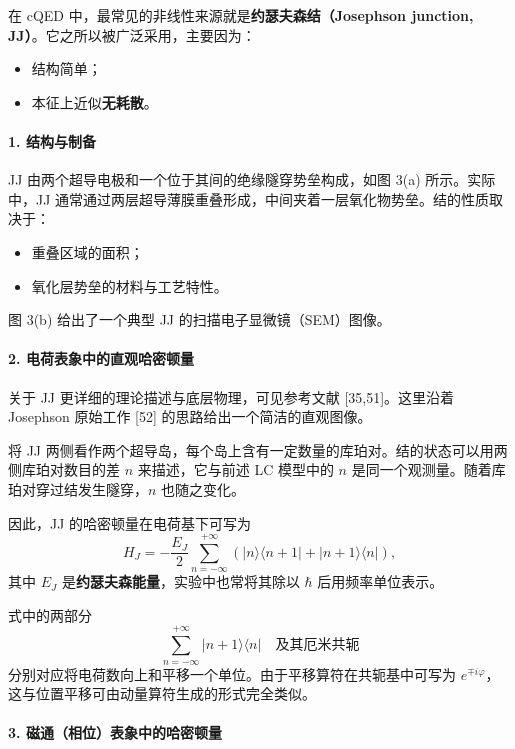 \documentclass[12pt,a4paper,oneside]{ctexbook}
\begin{document}
在 cQED 中，最常见的非线性来源就是\textbf{约瑟夫森结（Josephson junction, JJ）}。它之所以被广泛采用，主要因为：
\begin{itemize}[leftmargin=2em]
    \item 结构简单；
    \item 本征上近似\textbf{无耗散}。
\end{itemize}

\paragraph{1. 结构与制备}

JJ 由两个超导电极和一个位于其间的绝缘隧穿势垒构成，如图 3(a) 所示。实际中，JJ 通常通过两层超导薄膜重叠形成，中间夹着一层氧化物势垒。结的性质取决于：
\begin{itemize}[leftmargin=2em]
    \item 重叠区域的面积；
    \item 氧化层势垒的材料与工艺特性。
\end{itemize}

图 3(b) 给出了一个典型 JJ 的扫描电子显微镜（SEM）图像。

\paragraph{2. 电荷表象中的直观哈密顿量}

关于 JJ 更详细的理论描述与底层物理，可见参考文献 [35,51]。这里沿着 Josephson 原始工作 [52] 的思路给出一个简洁的直观图像。

将 JJ 两侧看作两个超导岛，每个岛上含有一定数量的库珀对。结的状态可以用两侧库珀对数目的差 \(n\) 来描述，它与前述 LC 模型中的 \(n\) 是同一个观测量。随着库珀对穿过结发生隧穿，\(n\) 也随之变化。

因此，JJ 的哈密顿量在电荷基下可写为
\begin{equation}
    H_J
    =
    -\frac{E_J}{2}
    \sum_{n=-\infty}^{+\infty}
    \left(
        \lvert n\rangle\langle n+1\rvert
        +
        \lvert n+1\rangle\langle n\rvert
    \right),
    \tag{11}
\end{equation}
其中 \(E_J\) 是\textbf{约瑟夫森能量}，实验中也常将其除以 \(\hbar\) 后用频率单位表示。

式中的两部分
\[
    \sum_{n=-\infty}^{+\infty}\lvert n+1\rangle\langle n\rvert
    \quad\text{及其厄米共轭}
\]
分别对应将电荷数向上和平移一个单位。由于平移算符在共轭基中可写为 \(e^{\mp i\varphi}\)，这与位置平移可由动量算符生成的形式完全类似。

\paragraph{3. 磁通（相位）表象中的哈密顿量}
\end{document}
